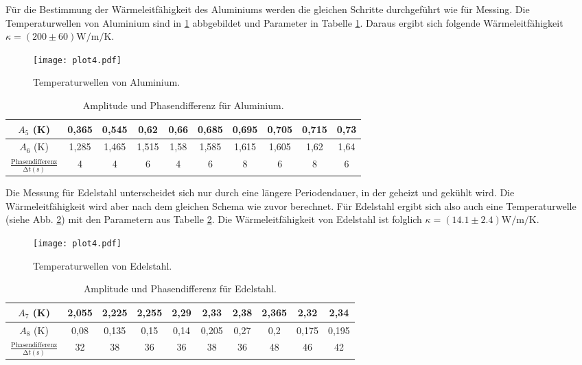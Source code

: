 Für die Bestimmung der Wärmeleitfähigkeit des Aluminiums werden die gleichen Schritte durchgeführt wie für Messing.
Die Temperaturwellen von Aluminium sind in \ref{fig:plot4} abbgebildet und Parameter in Tabelle \ref{tab:Aluminium}.
Daraus ergibt sich folgende Wärmeleitfähigkeit $\kappa = (200 \pm 60) \si{\watt\per\meter\per\kelvin}$.
\begin{figure}
  \centering
  \texttt{[image: plot4.pdf]}
  \caption{Temperaturwellen von Aluminium.}
  \label{fig:plot4}
\end{figure}
\begin{table}
  \centering
  \caption{Amplitude und Phasendifferenz für Aluminium.}
  \label{tab:Aluminium}
  \begin{tabular}{c c c c c c c c c c}
    \toprule
    $A_5$ (\si{\kelvin}) &  0,365 & 0,545 & 0,62 & 0,66 & 0,685 & 0,695 & 0,705 & 0,715 & 0,73 \\
    \midrule
    $A_6$ (\si{\kelvin}) & 1,285 & 1,465 & 1,515 & 1,58 & 1,585 & 1,615 & 1,605 & 1,62 & 1,64 \\
    \bottomrule
    $\frac{\text{Phasendifferenz}}{\increment t (\si{\second})}$ & 4 & 4 & 6 & 4 & 6 & 8 & 6 & 8 & 6 \\
  \end{tabular}
\end{table}
Die Messung für Edelstahl unterscheidet sich nur durch eine längere Periodendauer, in der geheizt und gekühlt wird.
Die Wärmeleitfähigkeit wird aber nach dem gleichen Schema wie zuvor berechnet.
Für Edelstahl ergibt sich also auch eine Temperaturwelle (siehe Abb. \ref{fig:plot5}) mit den Parametern aus Tabelle \ref{tab:Edelstahl}.
Die Wärmeleitfähigkeit von Edelstahl ist folglich $\kappa = (14.1 \pm 2.4) \si{\watt\per\meter\per\kelvin}$.
\begin{figure}
  \centering
  \texttt{[image: plot4.pdf]}
  \caption{Temperaturwellen von Edelstahl.}
  \label{fig:plot5}
\end{figure}
\begin{table}
  \centering
  \caption{Amplitude und Phasendifferenz für Edelstahl.}
  \label{tab:Edelstahl}
  \begin{tabular}{c c c c c c c c c c}
    \toprule
    $A_7$ (\si{\kelvin}) &  2,055 & 2,225 & 2,255 & 2,29 & 2,33 & 2,38 & 2,365 & 2,32 & 2,34 \\
    \midrule
    $A_8$ (\si{\kelvin}) & 0,08 & 0,135 & 0,15 & 0,14 & 0,205 & 0,27 & 0,2 & 0,175 & 0,195 \\
    \bottomrule
    $\frac{\text{Phasendifferenz}}{\increment t (\si{\second})}$ & 32 & 38 & 36 & 36 & 38 & 36 & 48 & 46 & 42 \\
  \end{tabular}
\end{table}
